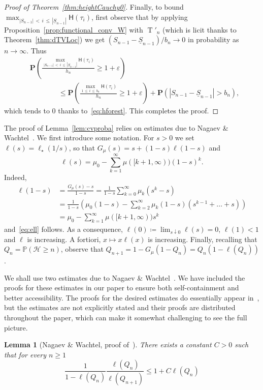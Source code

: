 \documentclass[10pt]{amsart}
\newtheorem{lemm}[theo]{Lemma}\newtheorem{prop}[theo]{Proposition}\newtheorem{coro}[theo]{Corollary}\newtheorem{conj}[theo]{Conjecture}
\theoremstyle{definition}\newtheorem{defi}[theo]{Definition}\newtheorem{rema}[theo]{Remark}\newtheorem{exam}[theo]{Example}\newtheorem{exem}[theo]{Example}\newtheorem{nota}[theo]{Notation}
\renewcommand{\P}{\mathbb{P}}
\newcommand{\height}{\mathsf{H}}
\newcommand{\p}{\mathbf{P}}
\DeclareMathOperator{\rtree}{T}
\newcommand{\cH}{\mathcal{H}}
\begin{document}
\begin{proof}[Proof of Theorem~\ref{thm:heightCauchy0}]
Finally, to bound $\max_{|S_{n-1}|\,<\,i\,\leq\,|\underline{S}_{n-1}|}\height(\tau_{i})$, first observe that by applying Proposition~\ref{prop:functional_conv_W} with $\rtree'_{ n}$ (which is licit thanks to Theorem~\ref{thm:dTVLoc}) we get $(S_{n-1}-\underline{S}_{n-1})/b_{n} \rightarrow 0$ in probability as $n \rightarrow \infty$. Thus
\begin{align*}
&\p \left(\frac{\max_{|S_{n-1}|\,<\,i\,\leq\,|\underline{S}_{n-1}|}\height(\tau_{i})}{h_{n}} \geq 1+\varepsilon \right) \\
& \qquad \qquad \leq
\p \left(\frac{\max_{1\,\leq\,i\,\leq\,b_{n} }\height(\tau_{i})}{h_{n}} \geq 1+ \varepsilon \right) + \p \left(|S_{n-1}-\underline{S}_{n-1}| > b_{n} \right),
\end{align*}
which tends to $0$ thanks to~\eqref{eq:hforest}. This completes the proof.
\end{proof}


The proof of Lemma~\ref{lem:cvproba} relies on estimates due to Nagaev \& Wachtel~\cite{NW07}. We first introduce some notation. For $s>0$ we set $\ell(s)=\ell_{\star}(1/s)$, so that $G_{\mu}(s)=s+(1-s) \ell \left(1-s\right)$ and
\begin{equation}\label{eq:ell}
\ell(s)=\mu_0 -\sum_{k=1}^\infty \mu([k+1,\infty)) (1-s)^k.
\end{equation}
Indeed,
\begin{align*}
\ell(1-s)&= \frac{G_{\mu}(s)-s}{1-s} = \frac{1}{1-s}\sum_{k=0}^\infty \mu_k\left(s^k-s\right)\\
&= \frac{1}{1-s}\left(\mu_0(1-s)-\sum_{k=2}^\infty \mu_k(1-s)(s^{k-1}+\dots+s)\right)\\
&=\mu_0 -\sum_{k=1}^\infty \mu([k+1,\infty)) s^k
\end{align*}
and~\eqref{eq:ell} follows. As a consequence, $\ell(0)\coloneqq \lim_{s\downarrow0}\ell(s)=0$, $\ell(1)<1$ and $\ell$ is increasing. A fortiori, $x \mapsto x \ell(x)$ is increasing. Finally, recalling that $Q_n = \P(\cH \geq n)$, observe that $Q_{n+1}=1-G_\mu(1-Q_n)=Q_{n}(1-\ell(Q_{n}))$.

We shall use two estimates due to Nagaev \& Wachtel~\cite{NW07}. We have included the proofs for these estimates in our paper to ensure both self-containment and better accessibility. The proofs for the desired estimates do essentially appear in~\cite{NW07}, but the estimates are not explicitly stated and their proofs are distributed throughout the paper, which can make it somewhat challenging to see the full picture.

\begin{lemm}[{Nagaev \& Wachtel, proof of~\cite[Lemma~5]{NW07}}]\label{lem:1}
There exists a constant $C>0$ such that for every $n \geq 1$
\[
\frac{1}{1-\ell(Q_{n})}\frac{\ell(Q_{n})}{\ell(Q_{n+1})} \leq 1+C \ell(Q_{n})
\]
\end{lemm}
\end{document}
